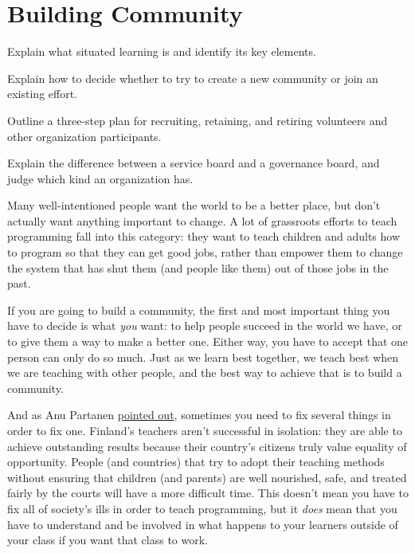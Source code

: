 \chapter{Building Community}\label{s:community}

\begin{objectives}

\item
  Explain what situated learning is and identify its key elements.

\item
  Explain how to decide whether to try to create a new community or
  join an existing effort.

\item
  Outline a three-step plan for recruiting, retaining, and retiring
  volunteers and other organization participants.

\item
  Explain the difference between a service board and a governance
  board, and judge which kind an organization has.

\end{objectives}

Many well-intentioned people want the world to be a better place, but
don't actually want anything important to change. A lot of grassroots
efforts to teach programming fall into this category: they want to teach
children and adults how to program so that they can get good jobs,
rather than empower them to change the system that has shut them (and
people like them) out of those jobs in the past.

If you are going to build a community, the first and most important
thing you have to decide is what \emph{you} want: to help people
succeed in the world we have, or to give them a way to make a better
one.  Either way, you have to accept that one person can only do so
much. Just as we learn best together, we teach best when we are
teaching with other people, and the best way to achieve that is to
build a community.

And as Anu Partanen
\href{https://www.theatlantic.com/national/archive/2011/12/what-americans-keep-ignoring-about-finlands-school-success/250564/}{pointed
  out}, sometimes you need to fix several things in order to fix one.
Finland's teachers aren't successful in isolation: they are able to
achieve outstanding results because their country's citizens truly
value equality of opportunity.  People (and countries) that try to
adopt their teaching methods without ensuring that children (and
parents) are well nourished, safe, and treated fairly by the courts
will have a more difficult time.  This doesn't mean you have to fix
all of society's ills in order to teach programming, but it
\emph{does} mean that you have to understand and be involved in what
happens to your learners outside of your class if you want that class
to work.

